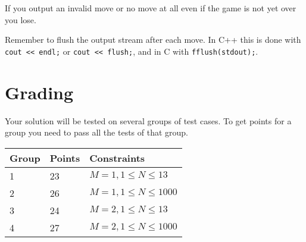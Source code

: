 If you output an invalid move or no move at all even if the game is not yet over you lose.

Remember to flush the output stream after each move.
In C++ this is done with \texttt{cout << endl;} or \texttt{cout << flush;}, and in C with \texttt{fflush(stdout);}.

\section*{Grading}
Your solution will be tested on several groups of test cases. To get points for a group you need to pass all the tests of that group.

\noindent
\begin{tabular}{| l | l | l |}
	\hline
	Group & Points & Constraints\\ \hline
1     & 23         & $ M=1, 1 \le N \le 13 $ \\ \hline
2     & 26         & $ M=1, 1 \le N \le 1000 $ \\ \hline
3     & 24         & $ M=2, 1 \le N \le 13 $ \\ \hline
4     & 27         & $ M=2, 1 \le N \le 1000 $ \\ \hline
\end{tabular}

